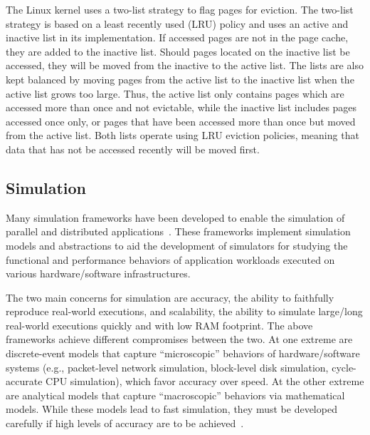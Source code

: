 \documentclass[conference]{IEEEtran}
\begin{document}
        The Linux kernel uses a two-list strategy to flag pages for eviction.
        The two-list strategy is based on a least recently used (LRU) policy
        and uses an active and inactive list in its implementation.
        If accessed pages are not in the page cache, they are added to the inactive list.
        Should pages located on the inactive list be accessed, they will be moved from
        the inactive to the active list.
        The lists are also kept balanced by moving pages from the active list
        to the inactive list when the active list grows too large.
        Thus, the active list only contains pages which are accessed more than once
        and not evictable, while the inactive list includes pages accessed once only,
        or pages that have been accessed more than once but moved from the active list.
        Both lists operate using LRU eviction policies, meaning that data that has
        not be accessed recently will be moved first.

        \subsection{Simulation}

        Many simulation frameworks have been developed to enable the
        simulation of parallel and distributed
        applications~\cite{optorsim, gridsim, groudsim, cloudsim,
        nunez2012simcan,nunez2012icancloud, mdcsim, dissect_cf,
        cloudnetsimplusplus, fognetsimplusplus, casanova2014simgrid,
        ROSS, casanova2020fgcs}. These frameworks implement simulation
        models and abstractions to aid the development of simulators
        for studying the functional and performance behaviors of
        application workloads executed on various hardware/software
        infrastructures. 

        The two main concerns for simulation are accuracy,
        the ability to faithfully reproduce real-world executions, and
        scalability, the ability to simulate large/long real-world
        executions quickly and with low RAM footprint. The above
        frameworks achieve different compromises between the two.  At
        one extreme are discrete-event models that capture
        ``microscopic'' behaviors of hardware/software systems (e.g.,
        packet-level network simulation, block-level disk simulation,
        cycle-accurate CPU simulation), which favor accuracy over
        speed.  At the other extreme are analytical models that capture
        ``macroscopic'' behaviors via mathematical models.  While these
        models lead to fast simulation, they must be developed
        carefully if high levels of accuracy are to be
        achieved~\cite{velhoTOMACS2013}. 
\end{document}
